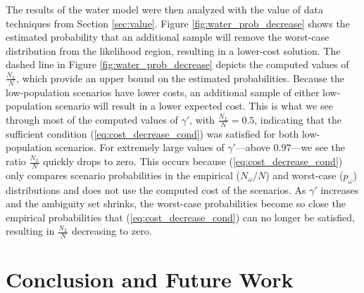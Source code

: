 \documentclass[11pt]{article}
\begin{document}

The results of the water model were then analyzed with the value of data techniques from Section \ref{sec:value}.
Figure \ref{fig:water_prob_decrease} shows the estimated probability that an additional sample will remove the worst-case distribution from the likelihood region, resulting in a lower-cost solution. %
The dashed line in Figure \ref{fig:water_prob_decrease} depicts the computed values of $\frac{N_L}{N}$, which provide an upper bound on the estimated probabilities. 
Because the low-population scenarios have lower costs, an additional sample of either low-population scenario will result in a lower expected cost.
This is what we see through most of the computed values of $\gamma'$, with $\frac{N_L}{N} = 0.5$, indicating that the sufficient condition (\ref{eq:cost_decrease_cond}) was satisfied for both low-population scenarios.
For extremely large values of $\gamma'$---above $0.97$---we see the ratio $\frac{N_L}{N}$ quickly drops to zero.
This occurs because (\ref{eq:cost_decrease_cond}) only compares scenario probabilities in the empirical ($N_\omega / N$) and worst-case ($p_\omega$) distributions and does not use the computed cost of the scenarios.
As $\gamma'$ increases and the ambiguity set shrinks, the worst-case probabilities become so close the empirical probabilities that (\ref{eq:cost_decrease_cond}) can no longer be satisfied, resulting in $\frac{N_L}{N}$ decreasing to zero.
% 

\section{Conclusion and Future Work}
\label{sec:concl}
\end{document}
